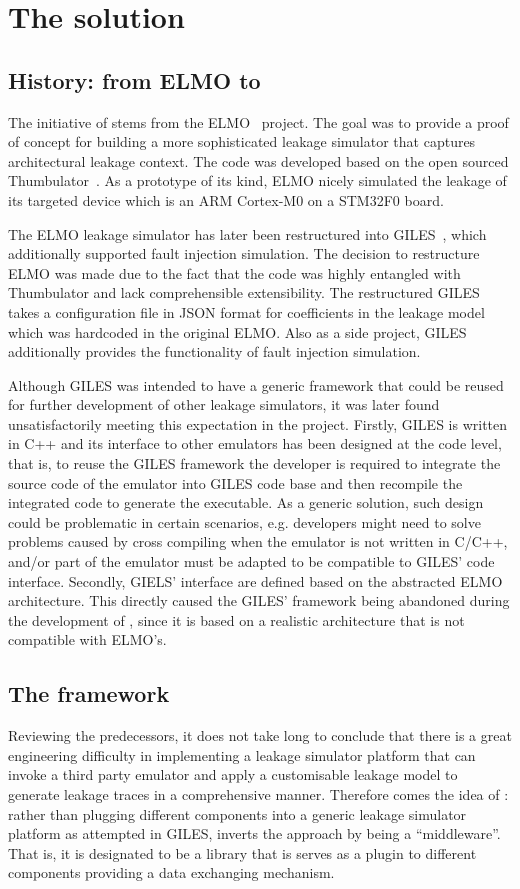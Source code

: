 \documentclass[]{report}
\begin{document}
\section{The \smurf solution}
\subsection{History: from ELMO to \uelmo}
The initiative of \smurf stems from the ELMO~\cite{ELMO} project. The goal was to provide a proof of concept for building a more sophisticated leakage simulator that captures architectural leakage context. The code was developed based on the open sourced Thumbulator~\cite{Thumbulator}. As a prototype of its kind, ELMO nicely simulated the leakage of its targeted device which is an ARM Cortex-M0 on a STM32F0 board.

The ELMO leakage simulator has later been restructured into GILES~\cite{GILES}, which additionally supported fault injection simulation. The decision to restructure ELMO was made due to the fact that the code was highly entangled with Thumbulator and lack comprehensible extensibility. The restructured GILES takes a configuration file in JSON format for coefficients in the leakage model which was hardcoded in the original ELMO. Also as a side project, GILES additionally provides the functionality of fault injection simulation.

Although GILES was intended to have a generic framework that could be reused for further development of other leakage simulators, it was later found unsatisfactorily meeting this expectation in the \uelmo project. Firstly, GILES is written in C++ and its interface to other emulators has been designed at the code level, that is, to reuse the GILES framework the developer is required to integrate the source code of the emulator into GILES code base and then recompile the integrated code to generate the executable.  As a generic solution, such design could be problematic in certain scenarios, e.g. developers might need to solve problems caused by cross compiling when the emulator is not written in C/C++, and/or part of the emulator must be adapted to be compatible to GILES' code interface. Secondly, GIELS' interface are defined based on the abstracted ELMO architecture. This directly caused the GILES' framework being abandoned during the development of \uelmo, since it is based on a realistic architecture that is not compatible with ELMO's.

\subsection{The \smurf framework}
Reviewing the predecessors, it does not take long to conclude that there is a great engineering difficulty in implementing a leakage simulator platform that can invoke a third party emulator and apply a customisable leakage model to generate leakage traces in a comprehensive manner. Therefore comes the idea of \smurf: rather than plugging different components into a generic leakage simulator platform as attempted in GILES, \smurf inverts the approach by being a ``middleware''. That is, it is designated to be a library that is serves as a plugin to different components providing a data exchanging mechanism.
\end{document}
